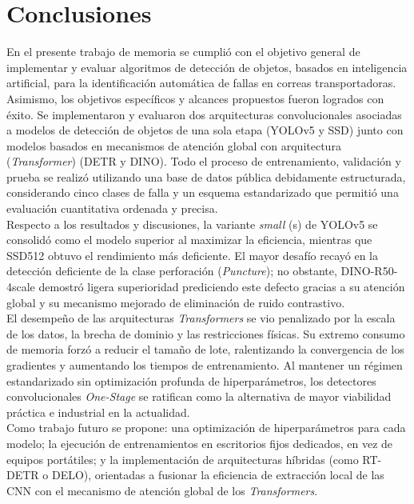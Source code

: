 \chapter{Conclusiones}

En el presente trabajo de memoria se cumplió con el objetivo general de implementar y evaluar algoritmos de detección de objetos, basados en inteligencia artificial, para la identificación automática de fallas en correas transportadoras. Asimismo, los objetivos específicos y alcances propuestos fueron logrados con éxito. Se implementaron y evaluaron dos arquitecturas convolucionales asociadas a modelos de detección de objetos de una sola etapa (YOLOv5 y SSD) junto con modelos basados en mecanismos de atención global con arquitectura (\textit{Transformer}) (DETR y DINO). Todo el proceso de entrenamiento, validación y prueba se realizó utilizando una base de datos pública debidamente estructurada, considerando cinco clases de falla y un esquema estandarizado que permitió una evaluación cuantitativa ordenada y precisa.\\


Respecto a los resultados y discusiones, la variante \textit{small} (s) de YOLOv5 se consolidó como el modelo superior al maximizar la eficiencia, mientras que SSD512 obtuvo el rendimiento más deficiente. El mayor desafío recayó en la detección deficiente de la clase perforación (\textit{Puncture}); no obstante, DINO-R50-4scale demostró ligera superioridad prediciendo este defecto gracias a su atención global y su mecanismo mejorado de eliminación de ruido contrastivo. \\

El desempeño de las arquitecturas \textit{Transformers} se vio penalizado por la escala de los datos, la brecha de dominio y las restricciones físicas. Su extremo consumo de memoria forzó a reducir el tamaño de lote, ralentizando la convergencia de los gradientes y aumentando los tiempos de entrenamiento. Al mantener un régimen estandarizado sin optimización profunda de hiperparámetros, los detectores convolucionales \textit{One-Stage} se ratifican como la alternativa de mayor viabilidad práctica e industrial en la actualidad. \\

Como trabajo futuro se propone: una optimización de hiperparámetros para cada modelo; la ejecución de entrenamientos en escritorios fijos dedicados, en vez de equipos portátiles; y la implementación de arquitecturas híbridas (como RT-DETR o DELO), orientadas a fusionar la eficiencia de extracción local de las CNN con el mecanismo de atención global de los \textit{Transformers}.